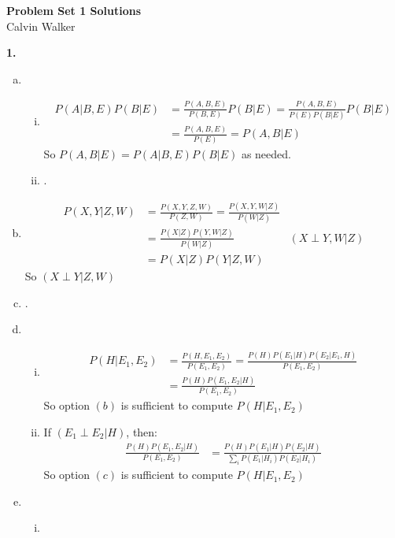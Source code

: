 \documentclass{article}
\begin{document}
\begin{center}
    \Large{\textbf{Problem Set 1 Solutions}} \\[0.25ex]
    Calvin Walker
\end{center}
\textbf{1.}
\begin{enumerate}[(a)]
    \item \begin{enumerate}[(i)]
        \item \begin{align*}
            P(A|B, E)P(B | E) &= \frac{P(A, B, E)}{P(B, E)}P(B|E) = \frac{P(A, B, E)}{P(E)P(B|E)}P(B|E) \\[0.5ex]
            &= \frac{P(A, B, E)}{P(E)} = P(A, B | E)
        \end{align*}
        So $P(A, B | E) =  P(A|B, E)P(B | E)$ as needed. 
        \item .
    \end{enumerate}
    \item \begin{align*}
        P(X, Y | Z, W) &= \frac{P(X, Y, Z, W)}{P(Z, W)} = \frac{P(X, Y, W|Z)}{P(W | Z)} \\ 
        &= \frac{P(X|Z)P(Y, W|Z)}{P(W|Z)} & (X \perp Y, W | Z) \\
        &= P(X|Z)P(Y|Z,W)
    \end{align*}
    So $(X \perp Y|Z, W)$
    \item .
    \item \begin{enumerate}[(i)]
        \item \begin{align*}
            P(H|E_1, E_2) &= \frac{P(H, E_1, E_2)}{P(E_1, E_2)} = \frac{P(H)P(E_1|H)P(E_2|E_1, H)}{P(E_1, E_2)} \\
            &= \frac{P(H)P(E_1, E_2 | H)}{P(E_1, E_2)}
        \end{align*}
        So option $(b)$ is sufficient to compute $P(H|E_1, E_2)$
        \item If $(E_1 \perp E_2 | H)$, then: \begin{align*}
            \frac{P(H)P(E_1, E_2 | H)}{P(E_1, E_2)} &= \frac{P(H)P(E_1|H) P(E_2 | H)}{\sum_{i}P(E_1|H_i)P(E_2|H_i)}
        \end{align*}
        So option $(c)$ is sufficient to compute $P(H|E_1, E_2)$
    \end{enumerate}
    \item \begin{enumerate}[(i)]
        \item \begin{align*}

\end{align*}
\end{enumerate}
\end{enumerate}
\end{document}
